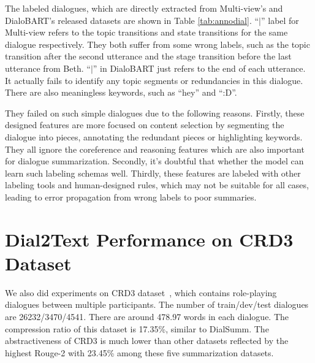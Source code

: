\documentclass[letterpaper]{article} %
\begin{document}
The labeled dialogues, which are directly extracted from Multi-view's and DialoBART's released datasets are shown in Table \ref{tab:annodial}. ``$\mid$'' label for Multi-view refers to the topic transitions and state transitions for the same dialogue respectively. They both suffer from some wrong labels, such as the topic transition after the second utterance and the stage transition before the last utterance from Beth.  ``$\mid$'' in DialoBART just refers to the end of each utterance. It actually fails to identify any topic segments or redundancies in this dialogue. There are also meaningless keywords, such as ``hey'' and ``:D''.

They failed on such simple dialogues due to the following reasons. Firstly, these designed features are more focused on content selection by segmenting the dialogue into pieces, annotating the redundant pieces or highlighting keywords. They all ignore the coreference and reasoning features which are also important for dialogue summarization. Secondly, it's doubtful that whether the model can learn such labeling schemas well. Thirdly, these features are labeled with other labeling tools and human-designed rules, which may not be suitable for all cases, leading to error propagation from wrong labels to poor summaries.


\section{Dial2Text Performance on CRD3 Dataset}



We also did experiments on CRD3 dataset~\cite{rameshkumar2020storytelling}, which contains role-playing dialogues between multiple participants. The number of train/dev/test dialogues are 26232/3470/4541. There are around 478.97 words in each dialogue. The compression ratio of this dataset is 17.35\%, similar to DialSumm. The abstractiveness of CRD3 is much lower than other datasets reflected by the highest Rouge-2 with 23.45\% among these five summarization datasets. 
\end{document}
